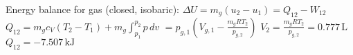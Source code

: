 Energy balance for gas (closed, isobaric):  
\( \Delta U = m_g (u_2 - u_1) = Q_{12} - W_{12} \)  
\( Q_{12} = m_g c_V (T_2 - T_1) + m_g \int_{p_1}^{p_2} p \, dv \)  
\( = p_{g,1} \left( V_{g,1} - \frac{m_g R T_2}{p_{g,2}} \right) \)  
\( V_2 = \frac{m_g R T_2}{p_{g,2}} = 0.777 \, \text{L} \)  
\( Q_{12} = -7.507 \, \text{kJ} \)